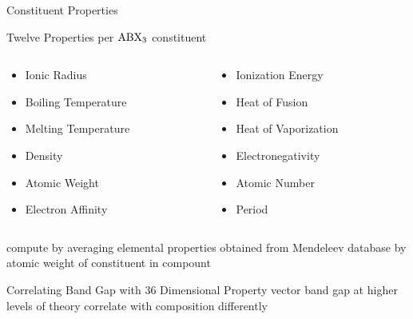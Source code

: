 \documentclass[10pt, aspectratio=169, presentation]{beamer}
\begin{document}
\begin{frame}[label={sec:org8b81894}]{Constituent Properties}
\begin{block}{Twelve Properties per \(\ce{ABX_3}\) constituent}
\begin{columns}
\begin{column}{0.5\columnwidth}
\begin{itemize}
\item Ionic Radius
\item Boiling Temperature
\item Melting Temperature
\item Density
\item Atomic Weight
\item Electron Affinity
\end{itemize}
\end{column}
\begin{column}{0.5\columnwidth}
\begin{itemize}
\item Ionization Energy
\item Heat of Fusion
\item Heat of Vaporization
\item Electronegativity
\item Atomic Number
\item Period
\end{itemize}
\end{column}
\end{columns}
\end{block}

compute by averaging elemental properties obtained from Mendeleev database
\autocite{mentel-2014}
by atomic weight of constituent in compount
\end{frame}

\begin{frame}[label={sec:org556d4ae}]{Correlating Band Gap with 36 Dimensional Property vector}
band gap at higher levels of theory correlate with composition differently\autocite{yang-2023-high-throug}

 
\begin{center}

\end{center}
\end{frame}
\end{document}
